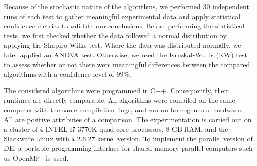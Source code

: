Because of the stochastic nature of the algorithms, we performed 30 independent runs of each test to gather meaningful experimental data and apply statistical confidence metrics to validate our conclusions. Before performing the statistical tests, we first checked whether the data followed a normal distribution by applying the Shapiro-Wilks test. Where the data was distributed normally, we later applied an ANOVA test. Otherwise, we used the Kruskal-Wallis (KW) test to assess whether or not there were meaningful differences between the compared algorithms with a confidence level of 99\%.

The considered algorithms were programmed in C++. Consequently, their runtimes are directly comparable. All algorithms were compiled on the same computer with the same compilation flags, and run on homogeneous hardware. All are positive attributes of a comparison. The experimentation is carried out on a cluster of 4 INTEL I7 3770K quad-core processors, 8 GB RAM, and the Slackware Linux with a 2.6.27 kernel version. To implement the parallel version of DE, a portable programming interface for shared memory parallel computers such us OpenMP~\cite{openMP} is used.